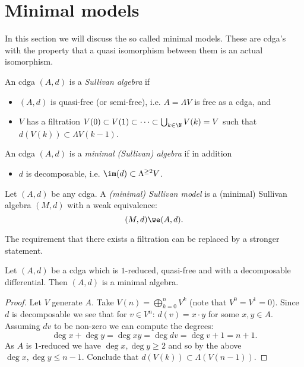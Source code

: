 
\section{Minimal models}
\label{sec:minimal-models}

In this section we will discuss the so called minimal models. These are cdga's with the property that a quasi isomorphism between them is an actual isomorphism.

\begin{definition}
	An cdga $(A, d)$ is a \emph{Sullivan algebra} if
	\begin{itemize}
		\item $(A, d)$ is quasi-free (or semi-free), i.e. $A = \Lambda V$ is free as a cdga, and
		\item $V$ has a filtration $V(0) \subset V(1) \subset \cdots \subset \bigcup_{k \in \N} V(k) = V$ such that $d(V(k)) \subset \Lambda V(k-1)$.
	\end{itemize}

	An cdga $(A, d)$ is a \emph{minimal (Sullivan) algebra} if in addition
	\begin{itemize}
		\item $d$ is decomposable, i.e. $\im(d) \subset \Lambda^{\geq 2}V$.
	\end{itemize}
\end{definition}

\begin{definition}
	Let $(A, d)$ be any cdga. A \emph{(minimal) Sullivan model} is a (minimal) Sullivan algebra $(M, d)$ with a weak equivalence:
	$$ (M, d) \we (A, d). $$
\end{definition}

The requirement that there exists a filtration can be replaced by a stronger statement.

\begin{lemma}
	Let $(A, d)$ be a cdga which is $1$-reduced, quasi-free and with a decomposable differential. Then $(A, d)$ is a minimal algebra.
\end{lemma}
\begin{proof}
	Let $V$ generate $A$. Take $V(n) = \bigoplus_{k=0}^n V^k$ (note that $V^0 = V^1 = 0$). Since $d$ is decomposable we see that for $v \in V^n$: $d(v) = x \cdot y$ for some $x, y \in A$. Assuming $dv$ to be non-zero we can compute the degrees:
	$$ \deg{x} + \deg{y} = \deg{xy} = \deg{dv} = \deg{v} + 1 = n + 1. $$
	As $A$ is $1$-reduced we have $\deg{x}, \deg{y} \geq 2$ and so by the above $\deg{x}, \deg{y} \leq n-1$. Conclude that $d(V(k)) \subset \Lambda(V(n-1))$.
\end{proof}


